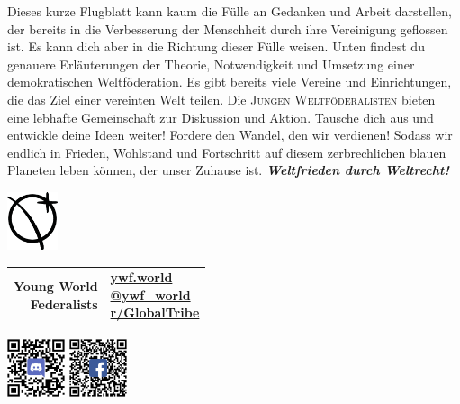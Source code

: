 \documentclass[11pt,a4paper]{article}
\begin{document}
Dieses kurze Flugblatt kann kaum die Fülle an Gedanken und Arbeit darstellen, der bereits in die Verbesserung der Menschheit durch ihre Vereinigung geflossen ist.
Es kann dich aber in die Richtung dieser Fülle weisen.
Unten findest du genauere Erläuterungen der Theorie, Notwendigkeit und Umsetzung einer demokratischen Weltföderation. Es gibt bereits viele Vereine und Einrichtungen, die das Ziel einer vereinten Welt teilen.
Die \textsc{Jungen Weltföderalisten} bieten eine lebhafte Gemeinschaft zur Diskussion und Aktion.
Tausche dich aus und entwickle deine Ideen weiter!
Fordere den Wandel, den wir verdienen!
Sodass wir endlich in Frieden, Wohlstand und Fortschritt auf diesem zerbrechlichen blauen Planeten leben können, der unser Zuhause ist.  \hfill \textbf{\textit{Weltfrieden durch Weltrecht!}}
\vspace{11pt}
\hline

\begin{multicols}{2}
\nocite{*}
\begingroup
{}
\setlength\bibitemsep{2pt}
\printbibliography[heading=none]
\endgroup
\end{multicols}

\hline
\vspace{6px}
\begin{minipage}{0.2\textwidth}
   \centering
    \includegraphics[height=64px]{LOGO.eps}
\end{minipage}%
\begin{minipage}{0.45\textwidth}
\begin{shaded*}
\begin{tabularx}{0.5\textwidth}{r|X}
\makecell[r]{\LARGE{\textbf{Young World}}\\ \LARGE{\textbf{Federalists}}} & \makecell[l]{\textbf{\href{https://www.ywf.world}{ywf.world}} \\ \textbf{\href{https://twitter.com/ywf_world}{@ywf\_world}}\\  
\textbf{\href{https://www.reddit.com/r/GlobalTribe/}{r/GlobalTribe}}}
\end{tabularx}
\end{shaded*}
\end{minipage}%
\begin{minipage}{0.3\textwidth}
\centering
\includegraphics[height=64px]{qrcode-discord.eps} \includegraphics[height=64px]{qrcode-facebook.eps}

\end{minipage}%
\end{document}
